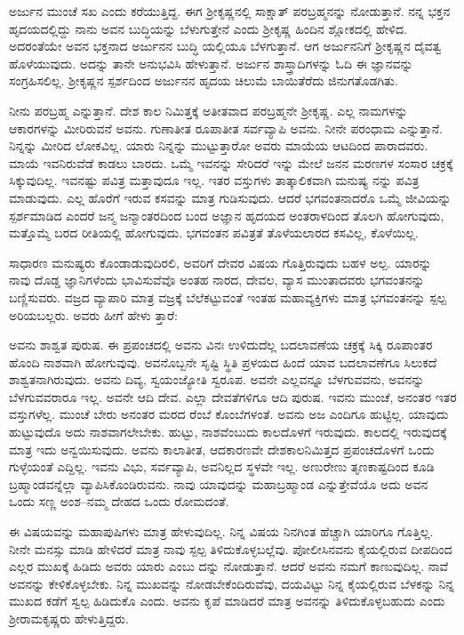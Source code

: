 ಅರ್ಜುನ ಮುಂಚೆ ಸಖ ಎಂದು ಕರೆಯುತ್ತಿದ್ದ. ಈಗ ಶ‍್ರೀಕೃಷ್ಣನಲ್ಲಿ ಸಾಕ್ಷಾತ್ ಪರಬ್ರಹ್ಮನನ್ನು ನೋಡುತ್ತಾನೆ. ನನ್ನ ಭಕ್ತನ ಹೃದಯದಲ್ಲಿದ್ದು ನಾನು ಅವನ ಬುದ್ಧಿಯನ್ನು ಬೆಳುಗುತ್ತೇನೆ ಎಂದು ಶ‍್ರೀಕೃಷ್ಣ ಹಿಂದಿನ ಶ್ಲೋಕದಲ್ಲಿ ಹೇಳಿದ. ಅದರಂತೆಯೇ ಅವನ ಭಕ್ತನಾದ ಅರ್ಜುನನ ಬುದ್ಧಿ ಯಲ್ಲಿಯೂ ಬೆಳಗುತ್ತಾನೆ. ಆಗ ಅರ್ಜುನನಿಗೆ ಶ‍್ರೀಕೃಷ್ಣನ ದೈವತ್ವ ಹೊಳೆಯುವುದು. ಅದನ್ನು ತಾನೇ ಅನುಭವಿಸಿ ಹೇಳುತ್ತಾನೆ. ಅರ್ಜುನ ಶಾಸ್ತ್ರಾದಿಗಳನ್ನು ಓದಿ ಈ ಜ್ಞಾನವನ್ನು ಸಂಗ್ರಹಿಸಲಿಲ್ಲ. ಶ‍್ರೀಕೃಷ್ಣನ ಸ್ಪರ್ಶದಿಂದ ಅರ್ಜುನನ ಹೃದಯ ಚಿಲುಮೆ ಬಾಯಿತೆರೆದು ಜಿನುಗತೊಡಗಿತು.

ನೀನು ಪರಬ್ರಹ್ಮ ಎನ್ನುತ್ತಾನೆ. ದೇಶ ಕಾಲ ನಿಮಿತ್ತಕ್ಕೆ ಅತೀತವಾದ ಪರಬ್ರಹ್ಮನೇ ಶ‍್ರೀಕೃಷ್ಣ. ಎಲ್ಲ ನಾಮಗಳನ್ನು ಆಕಾರಗಳನ್ನು ಮೀರಿರುವನೆ ಅವನು. ಗುಣಾತೀತ ರೂಪಾತೀತ ಸರ್ವವ್ಯಾಪಿ ಅವನು. ನೀನೇ ಪರಂಧಾಮ ಎನ್ನುತ್ತಾನೆ. ನಿನ್ನನ್ನು ಮೀರಿದ ಲೋಕವಿಲ್ಲ. ಯಾರು ನಿನ್ನನ್ನು ಮುಟ್ಟುತ್ತಾರೋ ಅವರು ಮಾಯೆಯ ಆಟದಿಂದ ಪಾರಾದವರು. ಮಾಯೆ ಇವನಿರುವೆಡೆ ಕಾಡಲು ಬಾರದು. ಒಮ್ಮೆ ಇವನನ್ನು ಸೇರಿದರೆ ಇನ್ನು ಮೇಲೆ ಜನನ ಮರಣಗಳ ಸಂಸಾರ ಚಕ್ರಕ್ಕೆ ಸಿಕ್ಕುವುದಿಲ್ಲ. ಇವನಷ್ಟು ಪವಿತ್ರ ಮತ್ತಾವುದೂ ಇಲ್ಲ. ಇತರ ವಸ್ತುಗಳು ತಾತ್ಕಾಲಿಕವಾಗಿ ಮನುಷ್ಯ ನನ್ನು ಪವಿತ್ರ ಮಾಡುವುದು. ಎಲ್ಲ ಹೊರೆಗೆ ಇರುವ ಕಸವನ್ನು ಮಾತ್ರ ಗುಡಿಸುವುದು. ಆದರೆ ಭಗವಂತನಾದರೊ ಒಮ್ಮೆ ಜೀವಿಯನ್ನು ಸ್ಪರ್ಶಮಾಡಿದ ಎಂದರೆ ಜನ್ಮ ಜನ್ಮಾಂತರದಿಂದ ಬಂದ ಅಜ್ಞಾನ ಹೃದಯದ ಅಂತರಾಳದಿಂದ ತೊಲಗಿ ಹೋಗುವುದು, ಮತ್ತೊಮ್ಮೆ ಬರದ ರೀತಿಯಲ್ಲಿ ಹೋಗುವುದು. ಭಗವಂತನ ಪವಿತ್ರತೆ ತೊಳೆಯಲಾರದ ಕಸವಿಲ್ಲ, ಕೊಳೆಯಿಲ್ಲ.

ಸಾಧಾರಣ ಮನುಷ್ಯರು ಕೊಂಡಾಡುವುದಿರಲಿ, ಅವರಿಗೆ ದೇವರ ವಿಷಯ ಗೊತ್ತಿರುವುದು ಬಹಳ ಅಲ್ಪ. ಯಾರನ್ನು ನಾವು ದೊಡ್ಡ ಜ್ಞಾನಿಗಳೆಂದು ಭಾವಿಸುವೆವೊ ಅಂತಹ ನಾರದ, ದೇವಲ, ವ್ಯಾಸ ಮುಂತಾದವರು ಭಗವಂತನನ್ನು ಬಣ್ಣಿಸುವರು. ವಜ್ರದ ವ್ಯಾಪಾರಿ ಮಾತ್ರ ವಜ್ರಕ್ಕೆ ಬೆಲೆಕಟ್ಟುವಂತೆ ಇಂತಹ ಮಹಾವ್ಯಕ್ತಿಗಳು ಮಾತ್ರ ಭಗವಂತನನ್ನು ಸ್ಪಲ್ಪ ಅರಿಯಬಲ್ಲರು. ಅವರು ಹೀಗೆ ಹೇಳು ತ್ತಾರೆ:

ಅವನು ಶಾಶ್ವತ ಪುರುಷ. ಈ ಪ್ರಪಂಚದಲ್ಲಿ ಅವನು ವಿನಃ ಉಳಿದುದೆಲ್ಲ ಬದಲಾವಣೆಯ ಚಕ್ರಕ್ಕೆ ಸಿಕ್ಕಿ ರೂಪಾಂತರ ಹೊಂದಿ ನಾಶವಾಗಿ ಹೋಗುವುವು. ಅವನೊಬ್ಬನೇ ಸೃಷ್ಟಿ ಸ್ಥಿತಿ ಪ್ರಳಯದ ಹಿಂದೆ ಯಾವ ಬದಲಾವಣೆಗೂ ಸಿಲುಕದೆ ಶಾಶ್ವತನಾಗಿರುವುದು. ಅವನು ದಿವ್ಯ, ಸ್ವಯಂಜ್ಯೋತಿ ಸ್ವರೂಪ. ಅವನೇ ಎಲ್ಲವನ್ನೂ ಬೆಳಗುವವನು, ಅವನನ್ನು ಬೆಳಗುವವರಾರೂ ಇಲ್ಲ. ಅವನೇ ಆದಿ ದೇವ. ಎಲ್ಲಾ ದೇವತೆಗಳಿಗೂ ಆದಿ ಪುರುಷ. ಇವನು ಮುಂಚೆ, ಅನಂತರ ಇತರ ವಸ್ತುಗಳೆಲ್ಲ. ಮುಂಚೆ ಬೇರು ಅನಂತರ ಮರದ ರೆಂಬೆ ಕೊಂಬೆಗಳಂತೆ. ಅವನು ಅಜ ಎಂದಿಗೂ ಹುಟ್ಟಿಲ್ಲ. ಯಾವುದು ಹುಟ್ಟುವುದೊ ಅದು ನಾಶವಾಗಲೇಬೇಕು. ಹುಟ್ಟು, ನಾಶವೆಂಬುದು ಕಾಲದೊಳಗೆ ಇರುವುದು. ಕಾಲದಲ್ಲಿ ಇರುವುದಕ್ಕೆ ಮಾತ್ರ ಇದು ಅನ್ವಯಿಸುವುದು. ಅವನು ಕಾಲಾತೀತ, ಆದಕಾರಣವೇ ದೇಶಕಾಲನಿಮಿತ್ತದ ಪ್ರಪಂಚದೊಳಗೆ ಒಂದು ಗುಳ್ಳೆಯಂತೆ ಎದ್ದಿಲ್ಲ. ಇವನು ವಿಭು, ಸರ್ವವ್ಯಾಪಿ, ಅವನಿಲ್ಲದ ಸ್ಥಳವೇ ಇಲ್ಲ. ಅಣುರೇಣು ತೃಣಕಾಷ್ಟದಿಂದ ಕೂಡಿ ಬ್ರಹ್ಮಾಂಡವನ್ನೆಲ್ಲಾ ವ್ಯಾಪಿಸಿಕೊಂಡಿರುವನು. ನಾವು ಯಾವುದನ್ನು ಮಹಾಬ್ರಹ್ಮಾಂಡ ಎನ್ನುತ್ತೇವೆಯೊ ಅದು ಅವನ ಒಂದು ಸಣ್ಣ ಅಂಶ–ನಮ್ಮ ದೇಹದ ಒಂದು ರೋಮದಂತೆ.

ಈ ವಿಷಯವನ್ನು ಮಹಾಪುಷಿಗಳು ಮಾತ್ರ ಹೇಳುವುದಿಲ್ಲ. ನಿನ್ನ ವಿಷಯ ನಿನಗಿಂತ ಹೆಚ್ಚಾಗಿ ಯಾರಿಗೂ ಗೊತ್ತಿಲ್ಲ. ನೀನೇ ಮನಸ್ಸು ಮಾಡಿ ಹೇಳಿದರೆ ಮಾತ್ರ ನಾವು ಸ್ಪಲ್ಪ ತಿಳಿದುಕೊಳ್ಳಬಲ್ಲೆವು. ಪೋಲೀಸಿನವನು ಕೈಯಲ್ಲಿರುವ ದೀಪದಿಂದ ಎಲ್ಲರ ಮುಖಕ್ಕೆ ಹಿಡಿದು ಅವರು ಯಾರು ಎಂಬು ದನ್ನು ನೋಡುತ್ತಾನೆ. ಆದರೆ ಅವನು ನಮಗೆ ಕಾಣುವುದಿಲ್ಲ. ನಾವೆ ಅವನನ್ನು ಕೇಳಿಕೊಳ್ಳಬೇಕು. ನಿನ್ನ ಮುಖವನ್ನು ನೋಡಬೇಕೆಂದಿರುವೆವು, ದಯವಿಟ್ಟು ನಿನ್ನ ಕೈಯಲ್ಲಿರುವ ಬೆಳಕನ್ನು ನಿನ್ನ ಮುಖದ ಕಡೆಗೆ ಸ್ವಲ್ಪ ಹಿಡಿದುಕೊ ಎಂದು. ಅವನು ಕೃಪೆ ಮಾಡಿದರೆ ಮಾತ್ರ ಅವನನ್ನು ತಿಳಿದುಕೊಳ್ಳಬಹುದು ಎಂದು ಶ‍್ರೀರಾಮಕೃಷ್ಣರು ಹೇಳುತ್ತಿದ್ದರು.

